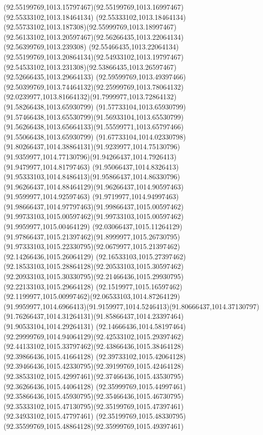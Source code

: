 {{	\curveto(92.55199769,1013.15797467)(92.55199769,1013.16997467)(92.55333102,1013.18464134)
	\curveto(92.55333102,1013.18464134)(92.55733102,1013.187308)(92.55999769,1013.18997467)
	\curveto(92.56133102,1013.20597467)(92.56266435,1013.22064134)(92.56399769,1013.239308)
	\curveto(92.55466435,1013.22064134)(92.55199769,1013.20864134)(92.54933102,1013.19797467)
	\curveto(92.54533102,1013.231308)(92.53866435,1013.26597467)(92.52666435,1013.29664133)
	\curveto(92.59599769,1013.49397466)(92.50399769,1013.74464132)(92.25999769,1013.78064132)
	\curveto(92.0239977,1013.81664132)(91.7999977,1013.72864132)(91.58266438,1013.65930799)
	\curveto(91.57733104,1013.65930799)(91.57466438,1013.65530799)(91.56933104,1013.65530799)
	\curveto(91.56266438,1013.65664133)(91.55599771,1013.65797466)(91.55066438,1013.65930799)
	\curveto(91.67733104,1014.02330798)(91.80266437,1014.38864131)(91.9239977,1014.75130796)
	\curveto(91.9359977,1014.77130796)(91.94266437,1014.7926413)(91.9479977,1014.81797463)
	\curveto(91.95066437,1014.8326413)(91.95333103,1014.8486413)(91.95866437,1014.86330796)
	\curveto(91.96266437,1014.88464129)(91.96266437,1014.90597463)(91.9599977,1014.92597463)
	\curveto(91.9719977,1014.94997463)(91.98666437,1014.97797463)(91.99866437,1015.00597462)
	\curveto(91.99733103,1015.00597462)(91.99733103,1015.00597462)(91.9959977,1015.00464129)
	\curveto(92.03066437,1015.11264129)(91.97866437,1015.21397462)(91.8999977,1015.26730795)
	\curveto(91.97333103,1015.22330795)(92.0679977,1015.21397462)(92.14266436,1015.26064129)
	\curveto(92.16533103,1015.27397462)(92.18533103,1015.28864128)(92.20533103,1015.30597462)
	\curveto(92.20933103,1015.30330795)(92.21466436,1015.29930795)(92.22133103,1015.29664128)
	\curveto(92.1519977,1015.16597462)(92.1199977,1015.00997462)(92.06533103,1014.87264129)
	\curveto(91.9959977,1014.6966413)(91.9159977,1014.5246413)(91.80666437,1014.37130797)
	\curveto(91.76266437,1014.31264131)(91.85866437,1014.23397464)(91.90533104,1014.29264131)
	\curveto(92.14666436,1014.58197464)(92.29999769,1014.94064129)(92.42533102,1015.29397462)
	\curveto(92.44133102,1015.33797462)(92.43866436,1015.38464128)(92.39866436,1015.41664128)
	\curveto(92.39733102,1015.42064128)(92.39466436,1015.42330795)(92.39199769,1015.42464128)
	\curveto(92.38533102,1015.42997461)(92.37466436,1015.43530795)(92.36266436,1015.44064128)
	\curveto(92.35999769,1015.44997461)(92.35866436,1015.45930795)(92.35466436,1015.46730795)
	\curveto(92.35333102,1015.47130795)(92.35199769,1015.47397461)(92.34933102,1015.47797461)
	\curveto(92.35199769,1015.48330795)(92.35599769,1015.48864128)(92.35999769,1015.49397461)
}}
